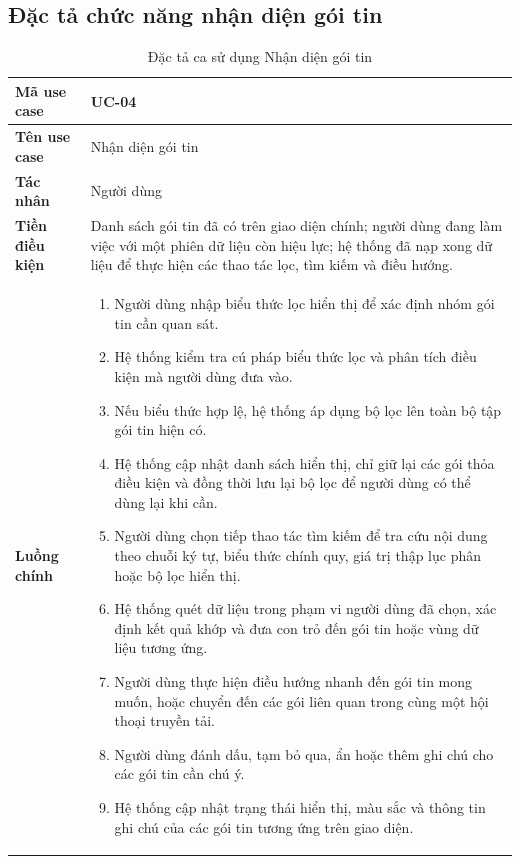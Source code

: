 \documentclass[../DoAn.tex]{subfiles}
\begin{document}
\subsection{Đặc tả chức năng nhận diện gói tin}
\begin{longtable}{|p{3.0cm}|p{11.0cm}|}
\caption{Đặc tả ca sử dụng Nhận diện gói tin} \label{tab:spec_nhan_dien_goi} \\
\hline
\textbf{Mã use case} & UC-04 \\ \hline
\textbf{Tên use case} & Nhận diện gói tin \\ \hline
\textbf{Tác nhân} & Người dùng \\ \hline
\textbf{Tiền điều kiện} & Danh sách gói tin đã có trên giao diện chính; người dùng đang làm việc với một phiên dữ liệu còn hiệu lực; hệ thống đã nạp xong dữ liệu để thực hiện các thao tác lọc, tìm kiếm và điều hướng. \\ \hline
\textbf{Luồng chính} & 
\begin{enumerate}[leftmargin=*,nosep]
\item Người dùng nhập biểu thức lọc hiển thị để xác định nhóm gói tin cần quan sát.
\item Hệ thống kiểm tra cú pháp biểu thức lọc và phân tích điều kiện mà người dùng đưa vào.
\item Nếu biểu thức hợp lệ, hệ thống áp dụng bộ lọc lên toàn bộ tập gói tin hiện có.
\item Hệ thống cập nhật danh sách hiển thị, chỉ giữ lại các gói thỏa điều kiện và đồng thời lưu lại bộ lọc để người dùng có thể dùng lại khi cần.
\item Người dùng chọn tiếp thao tác tìm kiếm để tra cứu nội dung theo chuỗi ký tự, biểu thức chính quy, giá trị thập lục phân hoặc bộ lọc hiển thị.
\item Hệ thống quét dữ liệu trong phạm vi người dùng đã chọn, xác định kết quả khớp và đưa con trỏ đến gói tin hoặc vùng dữ liệu tương ứng.
\item Người dùng thực hiện điều hướng nhanh đến gói tin mong muốn, hoặc chuyển đến các gói liên quan trong cùng một hội thoại truyền tải.
\item Người dùng đánh dấu, tạm bỏ qua, ẩn hoặc thêm ghi chú cho các gói tin cần chú ý.
\item Hệ thống cập nhật trạng thái hiển thị, màu sắc và thông tin ghi chú của các gói tin tương ứng trên giao diện.
\end{enumerate} \\ \hline

\end{longtable}
\end{document}

